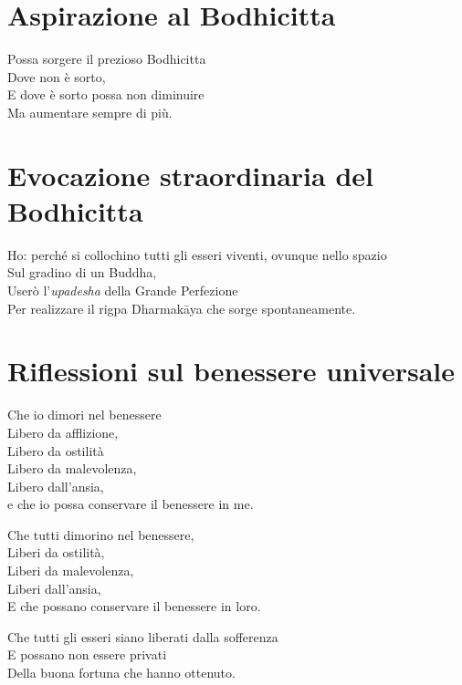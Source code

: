 \section{Aspirazione al Bodhicitta}
\vspace*{-1em}\noindent{}

Possa sorgere il prezioso Bodhicitta \\
Dove non è sorto, \\
E dove è sorto possa non diminuire \\
Ma aumentare sempre di più.

\section{Evocazione straordinaria del Bodhicitta}
\vspace*{-1em}\noindent{}

Ho: perché si collochino tutti gli esseri viventi, ovunque nello spazio \\
Sul gradino di un Buddha, \\
Userò l'\textit{upadesha} della Grande Perfezione \\
Per realizzare il rigpa Dharmakāya che sorge spontaneamente.

\section{Riflessioni sul benessere universale}
\vspace*{-1em}\noindent{}

Che io dimori nel benessere \\
Libero da afflizione, \\
Libero da ostilità \\
Libero da malevolenza, \\
Libero dall'ansia, \\
e che io possa conservare il benessere in me.

Che tutti dimorino nel benessere, \\
Liberi da ostilità, \\
Liberi da malevolenza, \\
Liberi dall'ansia, \\
E che possano conservare il benessere in loro.

Che tutti gli esseri siano liberati dalla sofferenza \\
E possano non essere privati \\
Della buona fortuna che hanno ottenuto.


